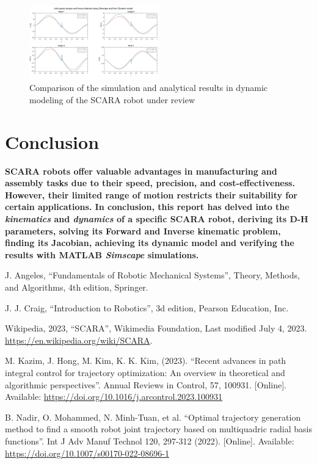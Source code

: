 \documentclass[conference]{IEEEtran}
\begin{document}
\begin{figure}[htbp]
    \centerline{\includegraphics[width=0.5\textwidth]{figures/comparison.png}}
    \caption{Comparison of the simulation and analytical results in dynamic modeling of the SCARA robot under review}
    \label{fig:comparison}
\end{figure}
\vspace{10px}

\section{Conclusion}
\textbf{
    SCARA robots offer valuable advantages in manufacturing and assembly tasks due to their speed, precision, and cost-effectiveness. However, their limited range of motion restricts their suitability for certain applications. In conclusion, this report has delved into the \textit{kinematics} and \textit{dynamics} of a specific SCARA robot, deriving its D-H parameters, solving its Forward and Inverse kinematic problem, finding its Jacobian, achieving its dynamic model and verifying the results with MATLAB \textit{Simscape} simulations.
}
\vspace{10px}

\begin{thebibliography}{00}
     J. Angeles, ``Fundamentals of Robotic Mechanical Systems'', Theory, Methods, and Algorithms, 4th edition, Springer.

     J. J. Craig, ``Introduction to Robotics'', 3d edition, Pearson Education, Inc.

     Wikipedia, 2023, ``SCARA'', Wikimedia Foundation, Last modified July 4, 2023. \url{https://en.wikipedia.org/wiki/SCARA}.

     M. Kazim, J. Hong, M. Kim, K. K. Kim, (2023). ``Recent advances in path integral control for trajectory optimization: An overview in theoretical and algorithmic perspectives''. Annual Reviews in Control, 57, 100931. [Online]. Available: \url{https://doi.org/10.1016/j.arcontrol.2023.100931}

     B. Nadir, O. Mohammed, N. Minh-Tuan, et al. ``Optimal trajectory generation method to find a smooth robot joint trajectory based on multiquadric radial basis functions''. Int J Adv Manuf Technol 120, 297-312 (2022). [Online]. Available: \url{https://doi.org/10.1007/s00170-022-08696-1}
\end{thebibliography}

\vspace{30px}
\end{document}
